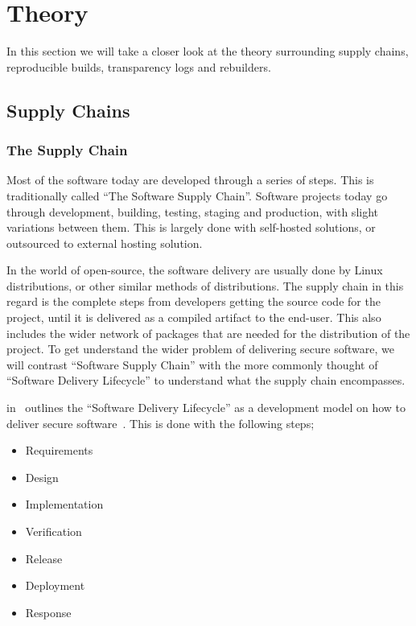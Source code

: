 \documentclass[../Main/thesis.tex]{subfiles}
\begin{document}
\chapter{Theory}
\label{ch:theory}
In this section we will take a closer look at the theory surrounding
supply chains, reproducible builds, transparency logs and rebuilders.

\section{Supply Chains}\label{sec:supply_chain}
\subsection*{The Supply Chain}
Most of the software today are developed through a series of steps. This is
traditionally called ``The Software Supply Chain''. Software projects today go
through development, building, testing, staging and production, with slight
variations between them. This is largely done with self-hosted solutions, or
outsourced to external hosting solution.

In the world of open-source, the software delivery are usually done by Linux
distributions, or other similar methods of distributions. The supply chain in
this regard is the complete steps from developers getting the source code for
the project, until it is delivered as a compiled artifact to the end-user. This
also includes the wider network of packages that are needed for the distribution
of the project. To get understand the wider problem of delivering secure
software, we will contrast ``Software Supply Chain'' with the more commonly
thought of ``Software Delivery Lifecycle'' to understand what the supply chain
encompasses.

\citeauthor{10.1109CSAC.2004.41} in~ outlines the
``Software Delivery Lifecycle'' as a development model on how to deliver secure
software~\cite{10.1109CSAC.2004.41}. This is done with the following steps;

\begin{itemize}
    \item Requirements
    \item Design
    \item Implementation
    \item Verification 
    \item Release
    \item Deployment
    \item Response
\end{itemize}
\end{document}
